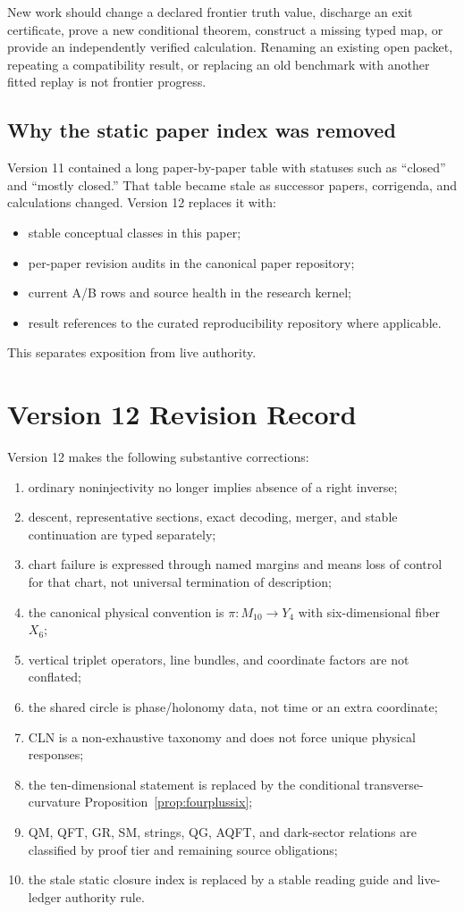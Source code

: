 \documentclass[11pt]{article}
\begin{document}
New work should change a declared frontier truth value, discharge an exit
certificate, prove a new conditional theorem, construct a missing typed map,
or provide an independently verified calculation.  Renaming an existing open
packet, repeating a compatibility result, or replacing an old benchmark with
another fitted replay is not frontier progress.

\subsection{Why the static paper index was removed}

Version 11 contained a long paper-by-paper table with statuses such as
``closed'' and ``mostly closed.''  That table became stale as successor
papers, corrigenda, and calculations changed.  Version 12 replaces it with:
\begin{itemize}
\item stable conceptual classes in this paper;
\item per-paper revision audits in the canonical paper repository;
\item current A/B rows and source health in the research kernel;
\item result references to the curated reproducibility repository where
applicable.
\end{itemize}
This separates exposition from live authority.

\section{Version 12 Revision Record}

Version 12 makes the following substantive corrections:
\begin{enumerate}[label=\arabic*.]
\item ordinary noninjectivity no longer implies absence of a right inverse;
\item descent, representative sections, exact decoding, merger, and stable
continuation are typed separately;
\item chart failure is expressed through named margins and means loss of
control for that chart, not universal termination of description;
\item the canonical physical convention is
$\pi:M_{10}\to Y_4$ with six-dimensional fiber $X_6$;
\item vertical triplet operators, line bundles, and coordinate factors are
not conflated;
\item the shared circle is phase/holonomy data, not time or an extra
coordinate;
\item CLN is a non-exhaustive taxonomy and does not force unique physical
responses;
\item the ten-dimensional statement is replaced by the conditional
transverse-curvature Proposition~\ref{prop:fourplussix};
\item QM, QFT, GR, SM, strings, QG, AQFT, and dark-sector relations are
classified by proof tier and remaining source obligations;
\item the stale static closure index is replaced by a stable reading guide and
live-ledger authority rule.
\end{enumerate}
\end{document}
